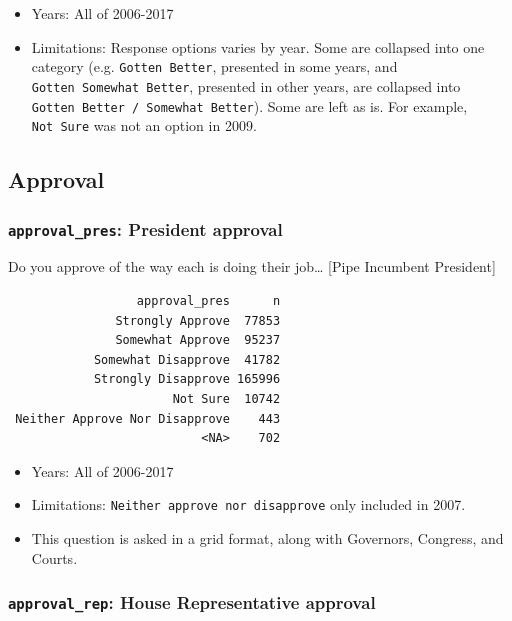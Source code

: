 \documentclass[10pt,article,oneside]{memoir}
\theoremstyle{definition}
\begin{document}
\begin{itemize}
\tightlist
\item
  Years: All of 2006-2017
\item
  Limitations: Response options varies by year. Some are collapsed into
  one category (e.g. \texttt{Gotten\ Better}, presented in some years,
  and \texttt{Gotten\ Somewhat\ Better}, presented in other years, are
  collapsed into \texttt{Gotten\ Better\ /\ Somewhat\ Better}). Some are
  left as is. For example, \texttt{Not\ Sure} was not an option in 2009.
\end{itemize}

\subsection{Approval}\label{approval}

\subsubsection{\texorpdfstring{\texttt{approval\_pres}: President
approval}{approval\_pres: President approval}}\label{approval_pres-president-approval}

Do you approve of the way each is doing their job\ldots{} {[}Pipe
Incumbent President{]}

\begin{verbatim}
                  approval_pres      n
               Strongly Approve  77853
               Somewhat Approve  95237
            Somewhat Disapprove  41782
            Strongly Disapprove 165996
                       Not Sure  10742
 Neither Approve Nor Disapprove    443
                           <NA>    702
\end{verbatim}

\begin{itemize}
\tightlist
\item
  Years: All of 2006-2017
\item
  Limitations: \texttt{Neither\ approve\ nor\ disapprove} only included
  in 2007.
\item
  This question is asked in a grid format, along with Governors,
  Congress, and Courts.
\end{itemize}

\subsubsection{\texorpdfstring{\texttt{approval\_rep}: House
Representative
approval}{approval\_rep: House Representative approval}}\label{approval_rep-house-representative-approval}
\end{document}
